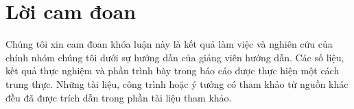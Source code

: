 \chapter*{Lời cam đoan}
\label{reassurances}

Chúng tôi xin cam đoan khóa luận này là kết quả làm việc và nghiên cứu của chính nhóm chúng tôi dưới sự hướng dẫn của giảng viên hướng dẫn. Các số liệu, kết quả thực nghiệm và phần trình bày trong báo cáo được thực hiện một cách trung thực. Những tài liệu, công trình hoặc ý tưởng có tham khảo từ nguồn khác đều đã được trích dẫn trong phần tài liệu tham khảo.
